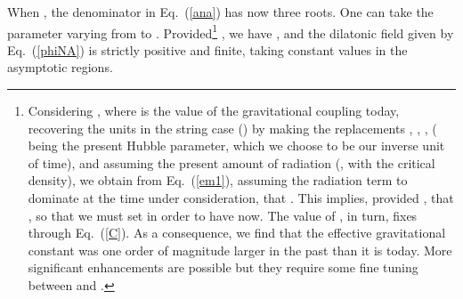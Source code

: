\documentclass[a4paper,aps,twocolumn,prd,showpacs,nofootinbib]{revtex4}
\providecommand{\GN}{G_{_{\rm N}}}
\begin{document}
When \coordHE{}, the denominator in Eq.~(\ref{ana}) has now three
roots. One can take the parameter \myHighlight{$\theta$}\coordHE{} varying from \coordHE{} to \coordHE{}. Provided\footnote{Considering
\myHighlight{$G_{\rm eff} = \GN/\phi$}\coordHE{}, where \myHighlight{$\GN$}\coordHE{} is the value of the
gravitational coupling today, recovering the units in the string case
(\coordHE{}) by making the replacements \myHighlight{$\phi \rightarrow \phi/\GN$}\coordHE{},
\myHighlight{$\Psi \rightarrow \Psi/\GN$}\coordHE{}, \coordHE{}, \coordHE{}
(\coordHE{} being the present Hubble parameter, which we choose to be our
inverse unit of time), and assuming the present amount of radiation
(\coordHE{}, with \coordHE{} the
critical density), we obtain from Eq.~(\ref{em1}), assuming the
radiation term to dominate at the time under consideration, that
\coordHE{}. This implies, provided \coordHE{}, that
\coordHE{}, so that we must set
\coordHE{} in order to have \coordHE{} now. The
value of \coordHE{}, in turn, fixes \coordHE{} through
Eq.~(\ref{C}). As a consequence, we find that the effective
gravitational constant \myHighlight{$\GN/\phi$}\coordHE{} was one order of magnitude larger in
the past than it is today. More significant enhancements are possible
but they require some fine tuning between \coordHE{} and \coordHE{}.} \coordHE{}, we
have \coordHE{}, and the dilatonic field given by
Eq.~(\ref{phiNA}) is strictly positive and finite, taking constant
values in the asymptotic regions.
\end{document}
